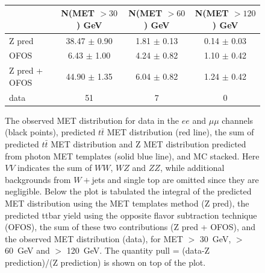 \begin{figure}[hbtp]
  \begin{center}
	\\ \medskip 
    \begin{tabular}{lccc}
\hline
                        &   N(MET $>30$)  GeV    &   N(MET $>60$)  GeV    &   N(MET $>120$) GeV   \\
\hline
              Z pred    &  38.47  $\pm$  0.90    &   1.81  $\pm$  0.13    &   0.14  $\pm$  0.03   \\
                OFOS    &   6.43  $\pm$  1.00    &   4.24  $\pm$  0.82    &   1.10  $\pm$  0.42   \\
\hline
       Z pred + OFOS    &  44.90  $\pm$  1.35    &   6.04  $\pm$  0.82    &   1.24  $\pm$  0.42   \\
\hline
                data    &                  51    &                   7    &                   0   \\
\hline
    \end{tabular}
    \caption{
      The observed MET distribution for data in the $ee$ and $\mu\mu$ channels (black points),
      predicted $t\bar{t}$ MET distribution (red line), the sum of predicted $t\bar{t}$ MET distribution and
      Z  MET  distribution  predicted  from photon  MET  templates
      (solid blue line),  and MC stacked. Here $VV$  indicates the sum
      of  $WW$,  $WZ$  and  $ZZ$, while  additional  backgrounds  from
      $W+$jets   and   single  top   are   omitted   since  they   are
      negligible.  Below the  plot is  tabulated the  integral  of the
      predicted  MET distribution  using the  MET templates  method (Z
      pred),  the  predicted ttbar  yield  using  the opposite  flavor
      subtraction  technique (OFOS), the  sum of  these two
      contributions (Z pred + OFOS), and the observed MET distribution
      (data), for  MET $>$ 30~GeV,  $>$ 60~GeV and $>$  120~GeV. The
      quantity pull  = (data-Z prediction)/(Z prediction)  is shown on
      top  of the  plot.  
    }
    \label{fig:pfmet_eemm}
  \end{center}
\end{figure}

